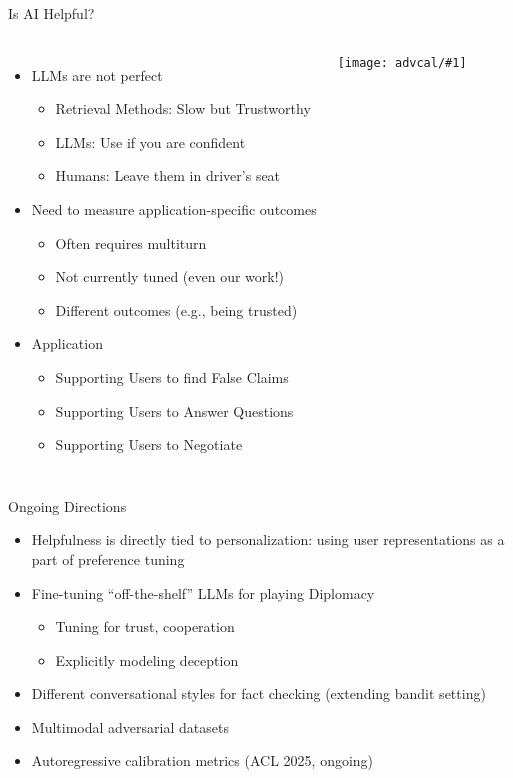 \documentclass[compress]{beamer}
\newcommand{\gfxa}[2]{
	\begin{center}
		\texttt{[image: advcal/\#1]}
	\end{center}
}
\newif\ifdiplomacy\diplomacytrue
\begin{document}
\begin{frame}{Is AI Helpful?}
	\begin{columns}
		
		\begin{itemize}
			\item LLMs are not perfect
			\begin{itemize}
				\item Retrieval Methods: Slow but Trustworthy
				\item LLMs: Use if you are confident
				\item Humans: Leave them in driver's seat
			\end{itemize}
			\item Need to measure application-specific outcomes
			\begin{itemize}
				\item Often requires multiturn
				\item Not currently tuned (even our work!)
				\item Different outcomes (e.g., being trusted)
			\end{itemize}
			\item Application
			\begin{itemize}
				\item Supporting Users to find False Claims
				\item Supporting Users to Answer Questions
				\ifdiplomacy
				\item Supporting Users to Negotiate
				\fi
			\end{itemize}
		\end{itemize}
		
		\gfxa{ken_vs_hal}{1}
	\end{columns}
\end{frame}

\begin{frame}{Ongoing Directions}
	\begin{itemize}
		\item Helpfulness is directly tied to personalization: using user representations as a part of preference tuning
		\item Fine-tuning ``off-the-shelf'' LLMs for playing Diplomacy
		\begin{itemize}
			\item Tuning for trust, cooperation
			\item Explicitly modeling deception
		\end{itemize}
		\item Different conversational styles for fact checking (extending bandit setting)
		\item \alert<2>{Multimodal adversarial datasets}
		\item Autoregressive calibration metrics (ACL 2025, ongoing)
	\end{itemize}
\end{frame}
\end{document}

